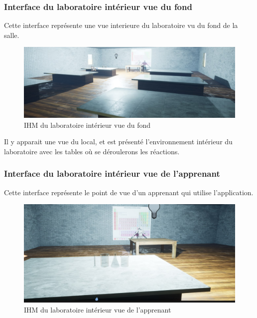 \subsubsection{Interface du laboratoire intérieur vue du fond}

Cette interface représente une vue interieure du laboratoire vu du fond de la salle.

\begin{figure}[H]
	\centering
	\includegraphics[width=1\textwidth]{img/labo1}
	\caption{IHM du laboratoire intérieur vue du fond}
	\label{fig:mesh1}
\end{figure}

Il y apparait une vue du local, et est présenté l'environnement intérieur du laboratoire avec les tables où se déroulerons les réactions.

\subsubsection{Interface du laboratoire intérieur vue de l'apprenant}

Cette interface représente le point de vue d'un apprenant qui utilise l'application.

\begin{figure}[H]
	\centering
	\includegraphics[width=1\textwidth]{img/labo2}
	\caption{IHM du laboratoire intérieur vue de l'apprenant}
	\label{fig:mesh1}
\end{figure}

